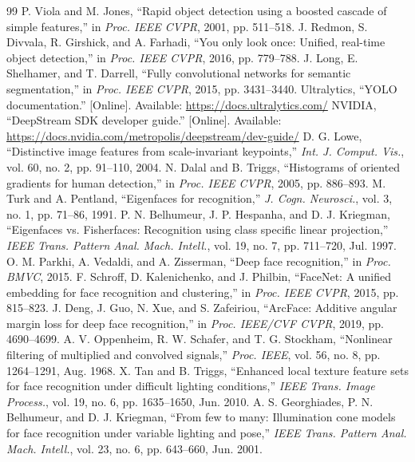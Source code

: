 \documentclass[conference,a4paper]{IEEEtran}
\begin{document}
\begin{thebibliography}{99}
 P. Viola and M. Jones, ``Rapid object detection using a boosted cascade of simple features,'' in \emph{Proc. IEEE CVPR}, 2001, pp. 511--518.
 J. Redmon, S. Divvala, R. Girshick, and A. Farhadi, ``You only look once: Unified, real-time object detection,'' in \emph{Proc. IEEE CVPR}, 2016, pp. 779--788.
 J. Long, E. Shelhamer, and T. Darrell, ``Fully convolutional networks for semantic segmentation,'' in \emph{Proc. IEEE CVPR}, 2015, pp. 3431--3440.
 Ultralytics, ``YOLO documentation.'' [Online]. Available: \url{https://docs.ultralytics.com/}
 NVIDIA, ``DeepStream SDK developer guide.'' [Online]. Available: \url{https://docs.nvidia.com/metropolis/deepstream/dev-guide/}
 D. G. Lowe, ``Distinctive image features from scale-invariant keypoints,'' \emph{Int. J. Comput. Vis.}, vol. 60, no. 2, pp. 91--110, 2004.
 N. Dalal and B. Triggs, ``Histograms of oriented gradients for human detection,'' in \emph{Proc. IEEE CVPR}, 2005, pp. 886--893.
 M. Turk and A. Pentland, ``Eigenfaces for recognition,'' \emph{J. Cogn. Neurosci.}, vol. 3, no. 1, pp. 71--86, 1991.
 P. N. Belhumeur, J. P. Hespanha, and D. J. Kriegman, ``Eigenfaces vs. Fisherfaces: Recognition using class specific linear projection,'' \emph{IEEE Trans. Pattern Anal. Mach. Intell.}, vol. 19, no. 7, pp. 711--720, Jul. 1997.
 O. M. Parkhi, A. Vedaldi, and A. Zisserman, ``Deep face recognition,'' in \emph{Proc. BMVC}, 2015.
 F. Schroff, D. Kalenichenko, and J. Philbin, ``FaceNet: A unified embedding for face recognition and clustering,'' in \emph{Proc. IEEE CVPR}, 2015, pp. 815--823.
 J. Deng, J. Guo, N. Xue, and S. Zafeiriou, ``ArcFace: Additive angular margin loss for deep face recognition,'' in \emph{Proc. IEEE/CVF CVPR}, 2019, pp. 4690--4699.
 A. V. Oppenheim, R. W. Schafer, and T. G. Stockham, ``Nonlinear filtering of multiplied and convolved signals,'' \emph{Proc. IEEE}, vol. 56, no. 8, pp. 1264--1291, Aug. 1968.
 X. Tan and B. Triggs, ``Enhanced local texture feature sets for face recognition under difficult lighting conditions,'' \emph{IEEE Trans. Image Process.}, vol. 19, no. 6, pp. 1635--1650, Jun. 2010.
 A. S. Georghiades, P. N. Belhumeur, and D. J. Kriegman, ``From few to many: Illumination cone models for face recognition under variable lighting and pose,'' \emph{IEEE Trans. Pattern Anal. Mach. Intell.}, vol. 23, no. 6, pp. 643--660, Jun. 2001.

\end{thebibliography}
\end{document}
